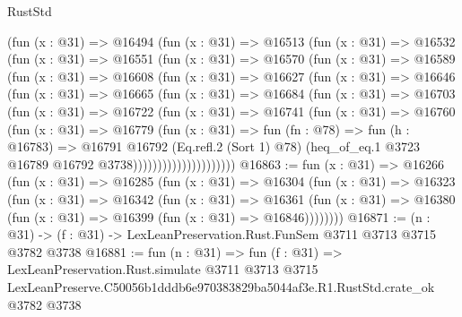 \begin{lexlean}{RustStd}
\begin{coremodule}
          (fun (x : @31) =>
          @16494
            (fun (x : @31) =>
            @16513
              (fun (x : @31) =>
              @16532
                (fun (x : @31) =>
                @16551
                  (fun (x : @31) =>
                  @16570
                    (fun (x : @31) =>
                    @16589
                      (fun (x : @31) =>
                      @16608
                        (fun (x : @31) =>
                        @16627
                          (fun (x : @31) =>
                          @16646
                            (fun (x : @31) =>
                            @16665
                              (fun (x : @31) =>
                              @16684
                                (fun (x : @31) =>
                                @16703
                                  (fun (x : @31) =>
                                  @16722
                                    (fun (x : @31) =>
                                    @16741
                                      (fun (x : @31) =>
                                      @16760
                                        (fun (x : @31) =>
                                        @16779
                                          (fun (x : @31) =>
                                          fun (fn : @78) =>
                                          fun (h : @16783) =>
                                          @16791
                                            @16792
                                            (Eq.refl.{2} (Sort 1) @78)
                                            (heq_of_eq.{1}
                                              @3723
                                              @16789
                                              @16792
                                              @3738)))))))))))))))))))))
@16863 := fun (x : @31) =>
  @16266
    (fun (x : @31) =>
    @16285
      (fun (x : @31) =>
      @16304
        (fun (x : @31) =>
        @16323
          (fun (x : @31) =>
          @16342
            (fun (x : @31) =>
            @16361
              (fun (x : @31) => @16380 (fun (x : @31) => @16399 (fun (x : @31) => @16846))))))))
@16871 := (n : @31) -> (f : @31) -> LexLeanPreservation.Rust.FunSem @3711 @3713 @3715 @3782 @3738
@16881 := fun (n : @31) =>
  fun (f : @31) =>
  LexLeanPreservation.Rust.simulate
    @3711
    @3713
    @3715
    LexLeanPreserve.C50056b1dddb6e970383829ba5044af3e.R1.RustStd.crate_ok
    @3782
    @3738
\end{coremodule}
\end{lexlean}
